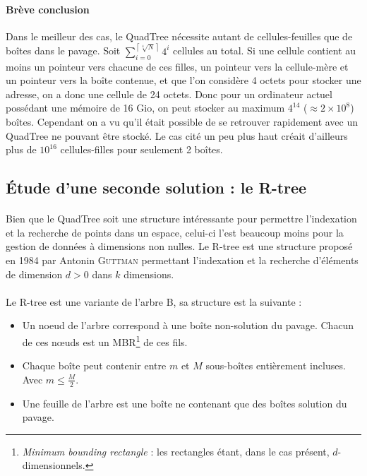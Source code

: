 \paragraph{Brève conclusion} Dans le meilleur des cas, le QuadTree nécessite autant de cellules-feuilles que de boîtes dans le pavage. Soit $\displaystyle {\sum_{i=0}^{\left\lceil{\sqrt[4]{N}}\right\rceil}} 4^i$ cellules au total. Si une cellule contient au moins un pointeur vers chacune de ces filles, un pointeur vers la cellule-mère et un pointeur vers la boîte contenue, et que l'on considère 4 octets pour stocker une adresse, on a donc une cellule de 24 octets.
Donc pour un ordinateur actuel possédant une mémoire de 16 Gio, on peut stocker au maximum $4^{14}$ ($\approx 2 \times 10^8$) boîtes. Cependant on a vu qu'il était possible de se retrouver rapidement avec un QuadTree ne pouvant être stocké. Le cas cité un peu plus haut créait d'ailleurs plus de $10^{16}$ cellules-filles pour seulement 2 boîtes.

\subsection{\'Etude d'une seconde solution : le R-tree}
\paragraph{}Bien que le QuadTree soit une structure intéressante pour permettre l'indexation et la recherche de points dans un espace, celui-ci l'est beaucoup moins pour la gestion de données à dimensions non nulles. Le R-tree est une structure proposé en 1984 par Antonin \textsc{Guttman} permettant l'indexation et la recherche d'éléments de dimension $d > 0$ dans $k$ dimensions\cite{Guttman}.

\paragraph{}Le R-tree est une variante de l'arbre B, sa structure est la suivante :
\begin{itemize}
 \item Un noeud de l'arbre correspond à une boîte non-solution du pavage. Chacun de ces nœuds est un MBR\footnote{\og \emph{Minimum bounding rectangle}\fg{} : les rectangles étant, dans le cas présent, $d$-dimensionnels.} de ces fils.
 \item Chaque boîte peut contenir entre $m$ et $M$ sous-boîtes entièrement incluses. Avec $m\leq \frac{M}{2}$.
 \item Une feuille de l'arbre est une boîte ne contenant que des boîtes solution du pavage.
\end{itemize}

